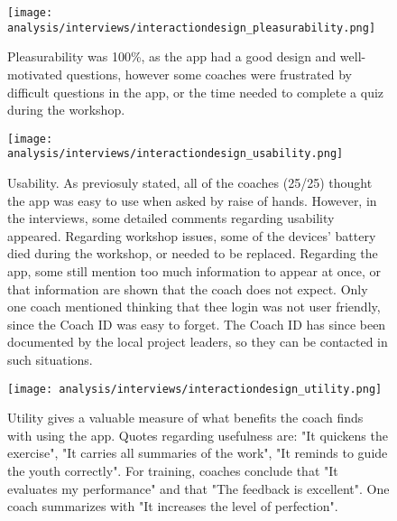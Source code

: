 \begin{figure}[h]
    \centering
    \texttt{[image: analysis/interviews/interactiondesign\_pleasurability.png]}
    \caption{Pleasurability was 100\%, as the app had a good design and well-motivated questions, however some coaches were frustrated by difficult questions in the app, or the time needed to complete a quiz during the workshop.}
    \label{fig:interaction1}
\end{figure}

\begin{figure}[h]
    \centering
    \texttt{[image: analysis/interviews/interactiondesign\_usability.png]}
    \caption{Usability. As previosuly stated, all of the coaches (25/25) thought the app was easy to use when asked by raise of hands. However, in the interviews, some detailed comments regarding usability appeared. Regarding workshop issues, some of the devices' battery died during the workshop, or needed to be replaced. Regarding the app, some still mention too much information to appear at once, or that information are shown that the coach does not expect. Only one coach mentioned thinking that thee login was not user friendly, since the Coach ID was easy to forget. The Coach ID has since been documented by the local project leaders, so they can be contacted in such situations.}
    \label{fig:interaction2}
\end{figure}

\begin{figure}[h]
    \centering
    \texttt{[image: analysis/interviews/interactiondesign\_utility.png]}
    \caption{Utility gives a valuable measure of what benefits the coach finds with using the app. Quotes regarding usefulness are: "It quickens the exercise", "It carries all summaries of the work", "It reminds to guide the youth correctly". For training, coaches conclude that "It evaluates my performance" and that "The feedback is excellent". One coach summarizes with "It increases the level of perfection".}
    \label{fig:interaction3}
\end{figure}

